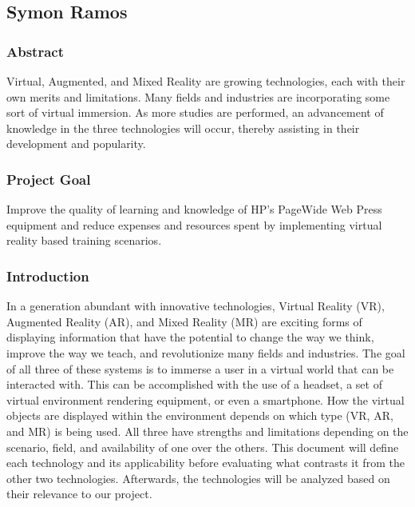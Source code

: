 \documentclass[onecolumn, draftclsnofoot,10pt, compsoc]{IEEEtran}
\begin{document}
\subsection{Symon Ramos}
\subsubsection{Abstract}
Virtual, Augmented, and Mixed Reality are growing technologies, each with their own merits and limitations. Many fields and industries are incorporating some sort of virtual immersion. As more studies are performed, an advancement of knowledge in the three technologies will occur, thereby assisting in their development and popularity.


\subsubsection {Project Goal}
 Improve the quality of learning and knowledge of HP's PageWide Web Press equipment and reduce expenses and resources spent by implementing virtual reality based training scenarios.
 
\subsubsection{Introduction}
    In a generation abundant with innovative technologies, Virtual Reality (VR), Augmented Reality (AR), and Mixed Reality (MR) are exciting forms of displaying information that have the potential to change the way we think, improve the way we teach, and revolutionize many fields and industries. 
    The goal of all three of these systems is to immerse a user in a virtual world that can be interacted with. This can be accomplished with the use of a headset, a set of virtual environment rendering equipment, or even a smartphone. How the virtual objects are displayed within the environment depends on which type (VR, AR, and MR) is being used. All three have strengths and limitations depending on the scenario, field, and availability of one over the others. This document will define each technology and its applicability before evaluating what contrasts it from the other two technologies. Afterwards, the technologies will be analyzed based on their relevance to our project.
    
\end{document}
